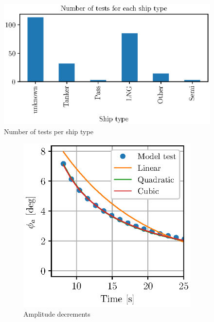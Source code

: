 \begin{figure}[H]
    \centering
    \includegraphics[width=0.5\columnwidth]{figures/ship_types.eps}
    \caption{Number of tests per ship type}
    \label{fig:ship_types}
\end{figure}

\begin{figure}[H]
    \begin{subfigure}[b]{0.45\textwidth}
        \centering
        \includegraphics[]{figures/roll_decay_amplitude.eps}
        \caption{Amplitude decrements}
        \label{fig:roll_decay_amplitude}
    \end{subfigure}
        ~ %
    \begin{subfigure}[b]{0.45\textwidth}
        \centering

\end{subfigure}
\end{figure}
